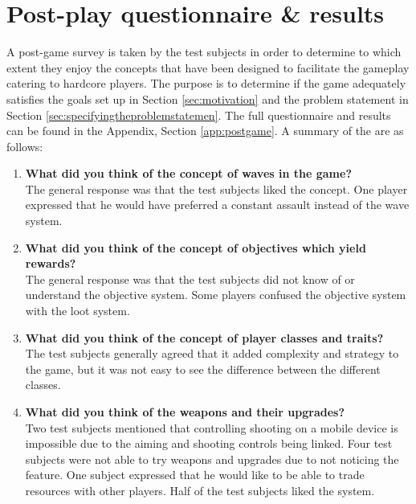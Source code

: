 \section{Post-play questionnaire \& results}\label{test:results}
A post-game survey is taken by the test subjects in order to determine to which extent they enjoy the concepts that have been designed to facilitate the gameplay catering to hardcore players.
The purpose is to determine if the game adequately satisfies the goals set up in Section \ref{sec:motivation} and the problem statement in Section \ref{sec:specifyingtheproblemstatemen}.
The full questionnaire and results can be found in the Appendix, Section \ref{app:postgame}.
A summary of the are as follows:
\begin{enumerate}\label{test:post-play}
\item \textbf{What did you think of the concept of waves in the game?}\vspace{4pt}\\
The general response was that the test subjects liked the concept.
One player expressed that he would have preferred a constant assault instead of the wave system.

\item \textbf{What did you think of the concept of objectives which yield rewards?}\vspace{4pt}\\
The general response was that the test subjects did not know of or understand the objective system.
Some players confused the objective system with the loot system.

\item \textbf{What did you think of the concept of player classes and traits?}\vspace{4pt}\\
The test subjects generally agreed that it added complexity and strategy to the game, but it was not easy to see the difference between the different classes.

\item \textbf{What did you think of the weapons and their upgrades?}\vspace{4pt}\\
Two test subjects mentioned that controlling shooting on a mobile device is impossible due to the aiming and shooting controls being linked.
Four test subjects were not able to try weapons and upgrades due to not noticing the feature.
One subject expressed that he would like to be able to trade resources with other players.
Half of the test subjects liked the system.


\end{enumerate}
